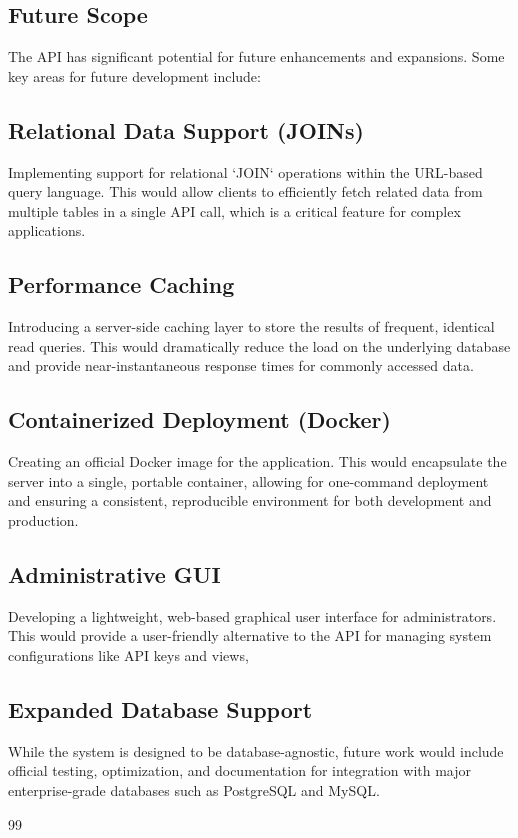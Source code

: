 \documentclass[12pt, a4paper]{report}
\begin{document}
\begin{enumerate}
\chapter{Future Scope}
The API has significant potential for future enhancements and expansions. Some key areas for future development include:

\section{Relational Data Support (JOINs)}
Implementing support for relational `JOIN` operations within the URL-based query language. This would allow clients to efficiently fetch related data from multiple tables in a single API call, which is a critical feature for complex applications.

\section{Performance Caching}
Introducing a server-side caching layer to store the results of frequent, identical read queries. This would dramatically reduce the load on the underlying database and provide near-instantaneous response times for commonly accessed data.

\section{Containerized Deployment (Docker)}
Creating an official Docker image for the application. This would encapsulate the server into a single, portable container, allowing for one-command deployment and ensuring a consistent, reproducible environment for both development and production.

\section{Administrative GUI}
Developing a lightweight, web-based graphical user interface for administrators. This would provide a user-friendly alternative to the API for managing system configurations like API keys and views, 

\section{Expanded Database Support}
While the system is designed to be database-agnostic, future work would include official testing, optimization, and documentation for integration with major enterprise-grade databases such as PostgreSQL and MySQL.
\renewcommand{\bibname}{References} %
\begin{thebibliography}{99}


\end{thebibliography}
\end{enumerate}
\end{document}
